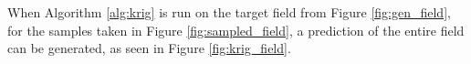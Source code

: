 \begin{algorithm}[thpb!]
\end{algorithm}

When Algorithm \ref{alg:krig} is run on the target field from Figure \ref{fig:gen_field}, for the samples taken in Figure \ref{fig:sampled_field}, a prediction of the entire field can be generated, as seen in Figure \ref{fig:krig_field}.
